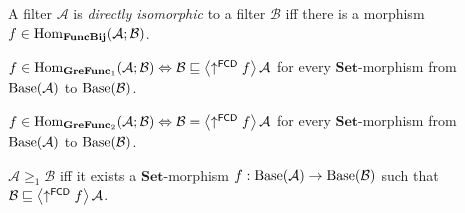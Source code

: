 \begin{defn}
A filter $\mathcal{A}$ is \emph{directly
isomorphic} to a filter $\mathcal{B}$ iff there is a morphism $f\in\operatorname{Hom}_{\mathbf{FuncBij}}(\mathcal{A};\mathcal{B})$.\end{defn}
\begin{obvious}
$f\in\operatorname{Hom}_{\mathbf{GreFunc}_{1}}(\mathcal{A};\mathcal{B})\Leftrightarrow\mathcal{B}\sqsubseteq\left\langle \uparrow^{\mathsf{FCD}}f\right\rangle\mathcal{A}$
for every $\mathbf{Set}$-morphism from $\operatorname{Base}(\mathcal{A})$ to $\operatorname{Base}(\mathcal{B})$.
\end{obvious}

\begin{obvious}
$f\in\operatorname{Hom}_{\mathbf{GreFunc}_{2}}(\mathcal{A};\mathcal{B})\Leftrightarrow\mathcal{B}=\left\langle \uparrow^{\mathsf{FCD}}f\right\rangle\mathcal{A}$
for every $\mathbf{Set}$-morphism from $\operatorname{Base}(\mathcal{A})$ to $\operatorname{Base}(\mathcal{B})$.
\end{obvious}

\begin{cor}
$\mathcal{A}\ge_{1}\mathcal{B}$ iff it exists a $\mathbf{Set}$-morphism
$f:\operatorname{Base}(\mathcal{A})\rightarrow\operatorname{Base}(\mathcal{B})$ such that $\mathcal{B}\sqsubseteq\left\langle \uparrow^{\mathsf{FCD}}f\right\rangle\mathcal{A}$.
\end{cor}

